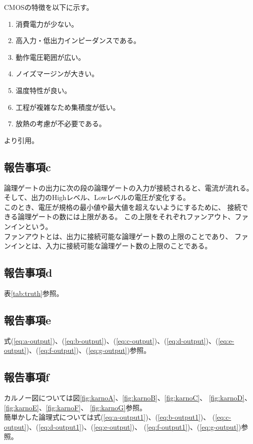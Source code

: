 \documentclass[a4paper,11pt,dvipdfmx]{jsarticle}
\begin{document}
CMOSの特徴を以下に示す。

\begin{enumerate}
  \item 消費電力が少ない。
  \item 高入力・低出力インピーダンスである。
  \item 動作電圧範囲が広い。
  \item ノイズマージンが大きい。
  \item 温度特性が良い。
  \item 工程が複雑なため集積度が低い。
  \item 放熱の考慮が不必要である。
\end{enumerate}
\cite{DenkiDai}より引用。\\

\subsection{報告事項c}
論理ゲートの出力に次の段の論理ゲートの入力が接続されると、電流が流れる。
そして、出力のHighレベル、Lowレベルの電圧が変化する。\\
このとき、電圧が規格の最小値や最大値を超えないようにするために、
接続できる論理ゲートの数には上限がある。
この上限をそれぞれファンアウト、ファンインという。\\
ファンアウトとは、出力に接続可能な論理ゲート数の上限のことであり、
ファンインとは、入力に接続可能な論理ゲート数の上限のことである\cite{ShokoDo}。

\subsection{報告事項d}
表\ref{tab:truth}参照。

\subsection{報告事項e}
式(\ref{eq:a-output})、(\ref{eq:b-output})、(\ref{eq:c-output})、(\ref{eq:d-output})、(\ref{eq:e-output})、(\ref{eq:f-output})、(\ref{eq:g-output})参照。

\subsection{報告事項f}
カルノー図については図\ref{fig:karnoA}、\ref{fig:karnoB}、\ref{fig:karnoC}、
\ref{fig:karnoD}、\ref{fig:karnoE}、\ref{fig:karnoF}、
\ref{fig:karnoG}参照。\\
簡単かした論理式については式(\ref{eq:a-output1})、(\ref{eq:b-output1})、
(\ref{eq:c-output})、(\ref{eq:d-output1})、(\ref{eq:e-output})、
(\ref{eq:f-output1})、(\ref{eq:g-output})参照。
\end{document}
